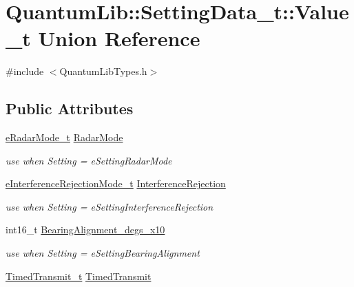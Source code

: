 \hypertarget{union_quantum_lib_1_1_setting_data__t_1_1_value__t}{}\section{Quantum\+Lib\+:\+:Setting\+Data\+\_\+t\+:\+:Value\+\_\+t Union Reference}
\label{union_quantum_lib_1_1_setting_data__t_1_1_value__t}


{\ttfamily \#include $<$Quantum\+Lib\+Types.\+h$>$}

\subsection*{Public Attributes}
\begin{DoxyCompactItemize}
\item 
\mbox{\hyperlink{namespace_quantum_lib_ade0390db62ad71cd1a56b97245d00619}{e\+Radar\+Mode\+\_\+t}} \mbox{\hyperlink{union_quantum_lib_1_1_setting_data__t_1_1_value__t_a623c4ea9593a93fcb7e9d5b3cca24808}{Radar\+Mode}}
\begin{DoxyCompactList}\small\item\em use when \textquotesingle{}Setting\textquotesingle{} = e\+Setting\+Radar\+Mode \end{DoxyCompactList}\item 
\mbox{\hyperlink{namespace_quantum_lib_a7dffda270c051259ba5338455f89b350}{e\+Interference\+Rejection\+Mode\+\_\+t}} \mbox{\hyperlink{union_quantum_lib_1_1_setting_data__t_1_1_value__t_a8a1e9e14cb15dd5de3165c93acac1ab7}{Interference\+Rejection}}
\begin{DoxyCompactList}\small\item\em use when \textquotesingle{}Setting\textquotesingle{} = e\+Setting\+Interference\+Rejection \end{DoxyCompactList}\item 
int16\+\_\+t \mbox{\hyperlink{union_quantum_lib_1_1_setting_data__t_1_1_value__t_a8854338a8e8ef9a3bd525afaf6226fe4}{Bearing\+Alignment\+\_\+degs\+\_\+x10}}
\begin{DoxyCompactList}\small\item\em use when \textquotesingle{}Setting\textquotesingle{} = e\+Setting\+Bearing\+Alignment \end{DoxyCompactList}\item 
\mbox{\hyperlink{struct_quantum_lib_1_1_timed_transmit__t}{Timed\+Transmit\+\_\+t}} \mbox{\hyperlink{union_quantum_lib_1_1_setting_data__t_1_1_value__t_a3e9bf45344ed4980a0fc343d5f12176f}{Timed\+Transmit}}

\end{DoxyCompactItemize}
